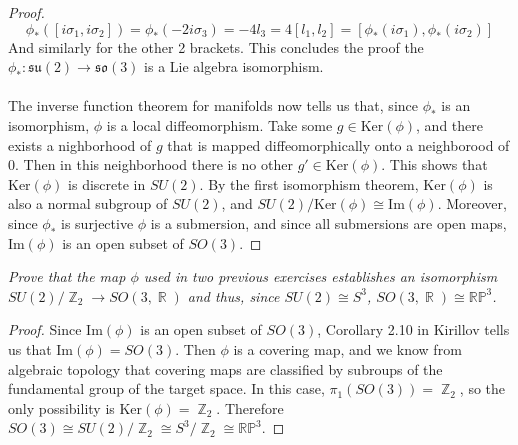 \documentclass[12 pt]{article}
\DeclareMathOperator {\R} {\mathbb{R}}
\DeclareMathOperator {\Z} {\mathbb{Z}}
\begin{document}
\begin{proof}
\[  \phi_* ([i \sigma_1 , i\sigma_2]) = \phi_* (-2i\sigma_3) = -4l_3 = 4 [l_1, l_2] = [\phi_*(i\sigma_1) , \phi_*(i\sigma_2)]   \]
And similarly for the other 2 brackets. This concludes the proof the $\phi_* : \mathfrak{su}(2) \to \mathfrak{so}(3)$ is a Lie algebra isomorphism.
\\
\\
The inverse function theorem for manifolds now tells us that, since $\phi_*$ is an isomorphism, $\phi$ is a local diffeomorphism. Take some $g\in \text{Ker}(\phi)$, and there exists a nighborhood of $g$ that is mapped diffeomorphically onto a neighborood of $0$. Then in this neighborhood there is no other $g' \in \text{Ker}(\phi)$. This shows that Ker$(\phi)$ is discrete in $SU(2)$. By the first isomorphism theorem, Ker$(\phi)$ is also a normal subgroup of $SU(2)$, and $SU(2)/\text{Ker}(\phi) \cong \text{Im}(\phi)$. Moreover, since $\phi_*$ is surjective $\phi$ is a submersion, and since all submersions are open maps, $\text{Im}(\phi)$ is an open subset of $SO(3)$.
\end{proof}

\emph{Prove that the map $\phi$ used in two previous exercises establishes an isomorphism $SU(2)/\Z_2 \to SO(3,\R)$ and thus, since $SU(2) \cong S^3$, 
$SO(3,\R) \cong \mathbb{RP}^3$.}
\begin{proof}
Since $\text{Im}(\phi)$ is an open subset of $SO(3)$, Corollary 2.10 in Kirillov tells us that $\text{Im}(\phi) = SO(3)$. Then $\phi$ is a covering map, and we know from algebraic topology that covering maps are classified by subroups of the fundamental group of the target space. In this case, $\pi_1 (SO(3)) = \Z_2$, so the only possibility is Ker$(\phi) = \Z_2$. Therefore $ SO(3) \cong SU(2)/\Z_2 \cong S^3 / \Z_2 \cong \mathbb{RP}^3$. 
\end{proof}
\end{document}
